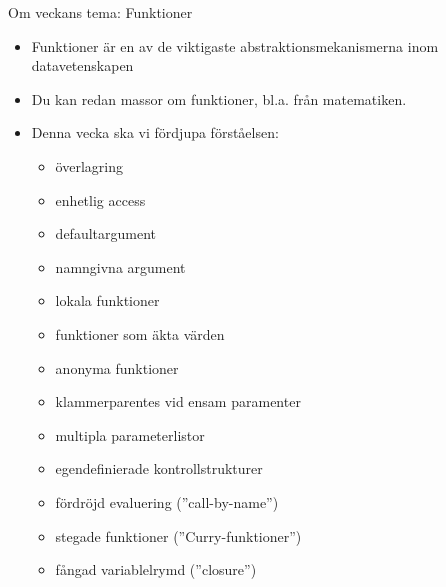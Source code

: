 




\ifkompendium\else
	\begin{SlideExtra}{Om veckans tema: Funktioner}
		\begin{itemize}
			\item Funktioner är en av de viktigaste abstraktionsmekanismerna inom datavetenskapen
			\item Du kan redan massor om funktioner, bl.a. från matematiken.
			\item Denna vecka ska vi fördjupa förståelsen:
			      \begin{itemize}
				      \item överlagring
				      \item enhetlig access
				      \item defaultargument
				      \item namngivna argument
				      \item lokala funktioner
				      \item funktioner som äkta värden
				      \item anonyma funktioner
				      \item klammerparentes vid ensam paramenter
				      \item multipla parameterlistor
				      \item egendefinierade kontrollstrukturer
				      \item fördröjd evaluering (''call-by-name'')
				      \item stegade funktioner (''Curry-funktioner'')
				      \item fångad variablelrymd (''closure'')
			      \end{itemize}
		\end{itemize}
	\end{SlideExtra}

